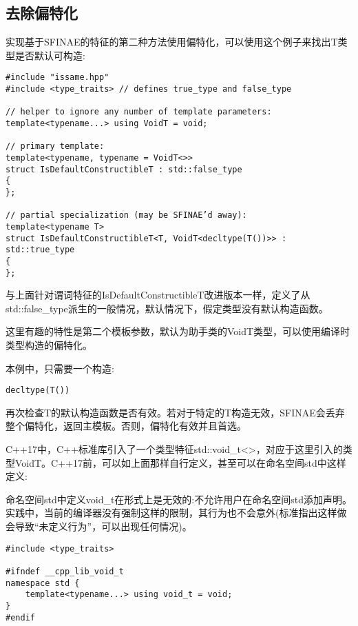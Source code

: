 \subsection{去除偏特化}

实现基于SFINAE的特征的第二种方法使用偏特化，可以使用这个例子来找出T类型是否默认可构造:

\begin{lstlisting}[style=styleCXX]
#include "issame.hpp"
#include <type_traits> // defines true_type and false_type

// helper to ignore any number of template parameters:
template<typename...> using VoidT = void;

// primary template:
template<typename, typename = VoidT<>>
struct IsDefaultConstructibleT : std::false_type
{
};

// partial specialization (may be SFINAE’d away):
template<typename T>
struct IsDefaultConstructibleT<T, VoidT<decltype(T())>> : std::true_type
{
};
\end{lstlisting}

与上面针对谓词特征的IsDefaultConstructibleT改进版本一样，定义了从std::false\_type派生的一般情况，默认情况下，假定类型没有默认构造函数。

这里有趣的特性是第二个模板参数，默认为助手类的VoidT类型，可以使用编译时类型构造的偏特化。

本例中，只需要一个构造:

\begin{lstlisting}[style=styleCXX]
decltype(T())
\end{lstlisting}

再次检查T的默认构造函数是否有效。若对于特定的T构造无效，SFINAE会丢弃整个偏特化，返回主模板。否则，偏特化有效并且首选。

C++17中，C++标准库引入了一个类型特征std::void\_t<>，对应于这里引入的类型VoidT。C++17前，可以如上面那样自行定义，甚至可以在命名空间std中这样定义:

\begin{tcolorbox}[colback=webgreen!5!white,colframe=webgreen!75!black]
\hspace*{0.75cm}命名空间std中定义void\_t在形式上是无效的:不允许用户在命名空间std添加声明。实践中，当前的编译器没有强制这样的限制，其行为也不会意外(标准指出这样做会导致“未定义行为”，可以出现任何情况)。
\end{tcolorbox}

\begin{lstlisting}[style=styleCXX]
#include <type_traits>

#ifndef __cpp_lib_void_t
namespace std {
	template<typename...> using void_t = void;
}
#endif
\end{lstlisting}

